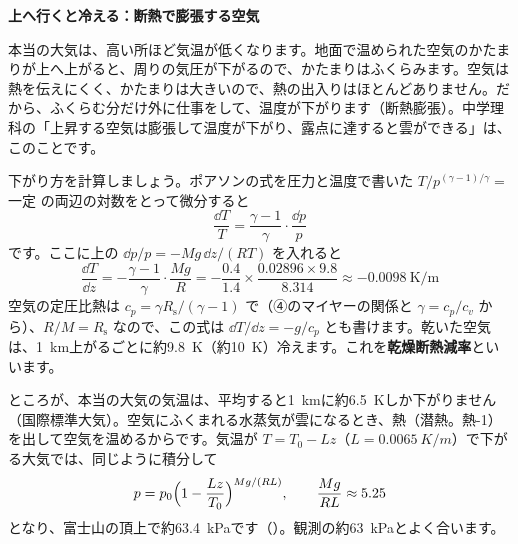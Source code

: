 \noindent\textbf{上へ行くと冷える：断熱で膨張する空気}\par\nobreak
\label{ph:熱-3:kumo}本当の大気は、高い所ほど気温が低くなります。地面で温められた空気のかたまりが上へ上がると、周りの気圧が下がるので、かたまりはふくらみます。空気は熱を伝えにくく、かたまりは大きいので、熱の出入りはほとんどありません。だから、ふくらむ分だけ外に仕事をして、温度が下がります（断熱膨張）。中学理科の「上昇する空気は膨張して温度が下がり、露点に達すると雲ができる」は、このことです。

下がり方を計算しましょう。ポアソンの式を圧力と温度で書いた $T/p^{(\gamma-1)/\gamma}=$一定 の両辺の対数をとって微分すると
\[ \frac{\dd T}{T}=\frac{\gamma-1}{\gamma}\cdot\frac{\dd p}{p} \]
です。ここに上の $\dd p/p=-Mg\,\dd z/(RT)$ を入れると
\[ \frac{\dd T}{\dd z}=-\frac{\gamma-1}{\gamma}\cdot\frac{Mg}{R}=-\frac{0.4}{1.4}\times\frac{0.02896\times9.8}{8.314}\approx-0.0098\ \mathrm{K/m} \]
空気の定圧比熱は $c_p=\gamma R_{\mathrm s}/(\gamma-1)$ で（④のマイヤーの関係と $\gamma=c_p/c_v$ から）、$R/M=R_{\mathrm s}$ なので、この式は $\dd T/\dd z=-g/c_p$ とも書けます。乾いた空気は、\qty{1}{km}上がるごとに約\qty{9.8}{K}（約\qty{10}{K}）冷えます。これを\textbf{乾燥断熱減率}といいます。

ところが、本当の大気の気温は、平均すると\qty{1}{km}に約\qty{6.5}{K}しか下がりません（国際標準大気）。空気にふくまれる水蒸気が雲になるとき、熱（潜熱。熱-1）を出して空気を温めるからです。気温が $T=T_0-Lz$（$L=\qty{0.0065}{K/m}$）で下がる大気では、同じように積分して
\[ p=p_0\Bigl(1-\frac{Lz}{T_0}\Bigr)^{Mg/(RL)},\qquad \frac{Mg}{RL}\approx5.25 \]
となり、富士山の頂上で約\qty{63.4}{kPa}です（）。観測の約\qty{63}{kPa}とよく合います。

\begin{phflow}
\end{phflow}

